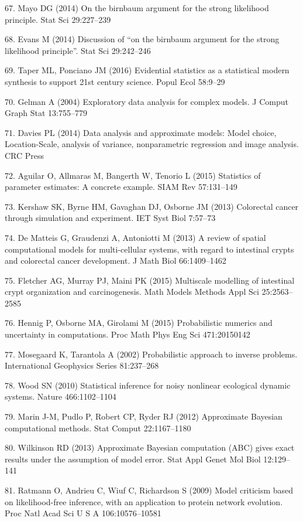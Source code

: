 \documentclass[10pt,letterpaper]{article}
\begin{document}
\hypertarget{ref-Mayo2014-pz}{}
67. Mayo DG (2014) On the birnbaum argument for the strong likelihood
principle. Stat Sci 29:227--239

\hypertarget{ref-Evans2014-gn}{}
68. Evans M (2014) Discussion of ``on the birnbaum argument for the
strong likelihood principle''. Stat Sci 29:242--246

\hypertarget{ref-Taper2016-la}{}
69. Taper ML, Ponciano JM (2016) Evidential statistics as a statistical
modern synthesis to support 21st century science. Popul Ecol 58:9--29

\hypertarget{ref-Gelman2004-bk}{}
70. Gelman A (2004) Exploratory data analysis for complex models. J
Comput Graph Stat 13:755--779

\hypertarget{ref-Davies2014-dz}{}
71. Davies PL (2014) Data analysis and approximate models: Model choice,
Location-Scale, analysis of variance, nonparametric regression and image
analysis. CRC Press

\hypertarget{ref-Aguilar2015-um}{}
72. Aguilar O, Allmaras M, Bangerth W, Tenorio L (2015) Statistics of
parameter estimates: A concrete example. SIAM Rev 57:131--149

\hypertarget{ref-Kershaw2013-jb}{}
73. Kershaw SK, Byrne HM, Gavaghan DJ, Osborne JM (2013) Colorectal
cancer through simulation and experiment. IET Syst Biol 7:57--73

\hypertarget{ref-De_Matteis2013-zo}{}
74. De Matteis G, Graudenzi A, Antoniotti M (2013) A review of spatial
computational models for multi-cellular systems, with regard to
intestinal crypts and colorectal cancer development. J Math Biol
66:1409--1462

\hypertarget{ref-Fletcher2015-yc}{}
75. Fletcher AG, Murray PJ, Maini PK (2015) Multiscale modelling of
intestinal crypt organization and carcinogenesis. Math Models Methods
Appl Sci 25:2563--2585

\hypertarget{ref-Hennig2015-im}{}
76. Hennig P, Osborne MA, Girolami M (2015) Probabilistic numerics and
uncertainty in computations. Proc Math Phys Eng Sci 471:20150142

\hypertarget{ref-Mosegaard2002-lx}{}
77. Mosegaard K, Tarantola A (2002) Probabilistic approach to inverse
problems. International Geophysics Series 81:237--268

\hypertarget{ref-Wood2010-hp}{}
78. Wood SN (2010) Statistical inference for noisy nonlinear ecological
dynamic systems. Nature 466:1102--1104

\hypertarget{ref-Marin2012-fd}{}
79. Marin J-M, Pudlo P, Robert CP, Ryder RJ (2012) Approximate Bayesian
computational methods. Stat Comput 22:1167--1180

\hypertarget{ref-Wilkinson2013-rs}{}
80. Wilkinson RD (2013) Approximate Bayesian computation (ABC) gives
exact results under the assumption of model error. Stat Appl Genet Mol
Biol 12:129--141

\hypertarget{ref-Ratmann2009-de}{}
81. Ratmann O, Andrieu C, Wiuf C, Richardson S (2009) Model criticism
based on likelihood-free inference, with an application to protein
network evolution. Proc Natl Acad Sci U S A 106:10576--10581
\end{document}
